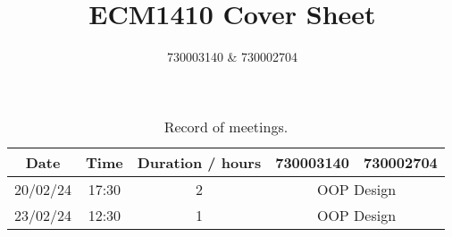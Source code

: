 \documentclass{article}
\title{ECM1410 Cover Sheet}
\author{730003140 \& 730002704}
\begin{document}
\maketitle

\begin{table}
    \centering
    \begin{tabular}{ccccc}
        \toprule
        \textbf{Date} & \textbf{Time} & \textbf{Duration / hours} & \textbf{730003140}             & \textbf{730002704} \\
        \midrule
        20/02/24      & 17:30         & 2                         & \multicolumn{2}{c}{OOP Design}                      \\
        23/02/24      & 12:30         & 1                         & \multicolumn{2}{c}{OOP Design}                      \\
        \bottomrule
    \end{tabular}
    \caption{Record of meetings.}
\end{table}
\end{document}
